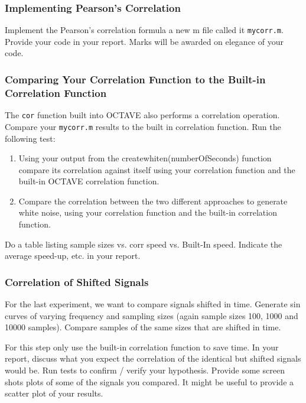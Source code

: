 \subsubsection{Implementing Pearson's Correlation}
Implement the Pearson's correlation formula a new m file called it \verb|mycorr.m|. Provide your code in your report. Marks will be awarded on elegance of your code.

\subsubsection{Comparing Your Correlation Function to the Built-in Correlation Function}
The \verb|cor| function built into OCTAVE also performs a correlation operation. Compare your \verb|mycorr.m| results to the built in correlation function. Run the following test:

\begin{enumerate}
    \item Using your output from the createwhiten(numberOfSeconds) function compare its correlation against itself using your correlation function and the built-in OCTAVE correlation function.
    \item Compare the correlation between the two different approaches to generate white noise, using your correlation function and the built-in correlation function.
\end{enumerate}


Do a table listing sample sizes vs. corr speed vs. Built-In speed. Indicate the average speed-up, etc. in your report.

\subsubsection{Correlation of Shifted Signals}
For the last experiment, we want to compare signals shifted in time. Generate sin curves of varying frequency and sampling sizes (again sample sizes 100, 1000 and 10000 samples). Compare samples of the same sizes that are shifted in time.

For this step only use the built-in correlation function to save time. In your report, discuss what you expect the correlation of the identical but shifted signals would be. Run tests to confirm / verify your hypothesis. Provide some screen shots plots of some of the signals you compared. It might be useful to provide a scatter plot of your results.

